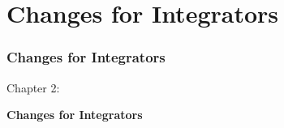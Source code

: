 %

\section{Changes for Integrators}
\begin{frame}[fragile]
	\frametitle{Changes for Integrators}

	\begin{center}\huge{Chapter 2:}\end{center}
	\begin{center}\huge{\color{typo3darkgrey}\textbf{Changes for Integrators}}\end{center}

\end{frame}

